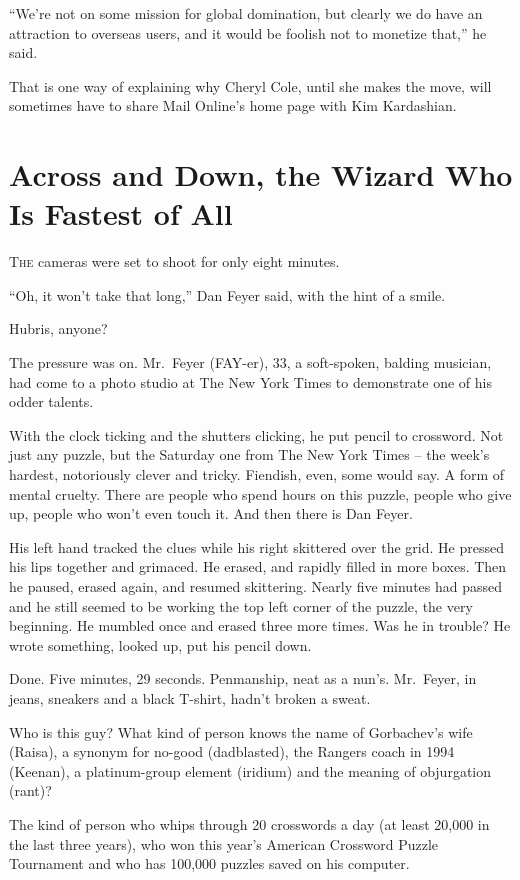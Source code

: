 ﻿\documentclass[12pt]{article}
\begin{document}
``We're not on some mission for global domination, but clearly we do have an attraction to overseas
users, and it would be foolish not to monetize that,'' he said.

That is one way of explaining why Cheryl Cole, until she makes the move, will sometimes have to
share Mail Online's home page with Kim Kardashian.

\section{Across and Down, the Wizard Who Is Fastest of All}

\lettrine{T}{he} cameras were set to shoot for only eight minutes.

``Oh, it won't take that long,'' Dan Feyer said, with the hint of a smile.

Hubris, anyone?

The pressure was on. Mr.~Feyer (FAY-er), 33, a soft-spoken, balding musician, had come to a photo
studio at The New York Times to demonstrate one of his odder talents.

With the clock ticking and the shutters clicking, he put pencil to crossword. Not just any puzzle,
but the Saturday one from The New York Times -- the week's hardest, notoriously clever and tricky.
Fiendish, even, some would say. A form of mental cruelty. There are people who spend hours on this
puzzle, people who give up, people who won't even touch it. And then there is Dan Feyer.

His left hand tracked the clues while his right skittered over the grid. He pressed his lips
together and grimaced. He erased, and rapidly filled in more boxes. Then he paused, erased again,
and resumed skittering. Nearly five minutes had passed and he still seemed to be working the top
left corner of the puzzle, the very beginning. He mumbled once and erased three more times. Was he
in trouble? He wrote something, looked up, put his pencil down.

Done. Five minutes, 29 seconds. Penmanship, neat as a nun's. Mr.~Feyer, in jeans, sneakers and a
black T-shirt, hadn't broken a sweat.

Who is this guy? What kind of person knows the name of Gorbachev's wife (Raisa), a synonym for
no-good (dadblasted), the Rangers coach in 1994 (Keenan), a platinum-group element (iridium) and the
meaning of objurgation (rant)?

The kind of person who whips through 20 crosswords a day (at least 20,000 in the last three years),
who won this year's American Crossword Puzzle Tournament and who has 100,000 puzzles saved on his
computer.
\end{document}
